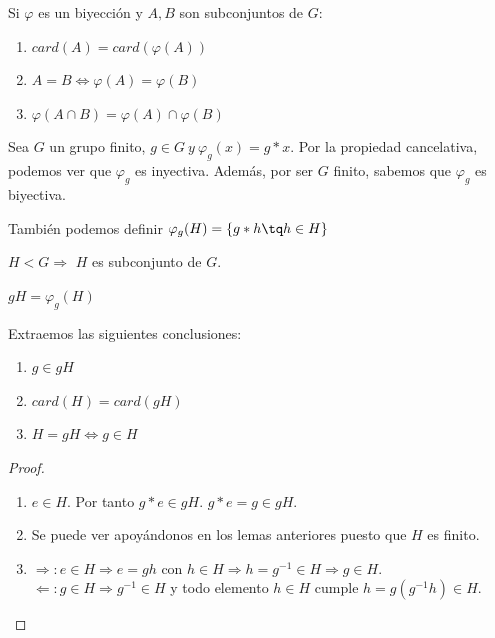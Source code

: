 \documentclass[a4paper,10pt]{apuntes}
\newenvironment{notacion}[1][Notación:]{\begin{trivlist}
\item[\hskip \labelsep {\bfseries #1}]}{\end{trivlist}}
\begin{document}
  \begin{lemma}
   Si $\varphi$  es un biyección y $A, B$ son subconjuntos de $G$:
   \begin{enumerate}
    \item $card(A)=card(\varphi(A))$
    \item $A=B \Leftrightarrow \varphi(A)=\varphi(B)$
    \item $\varphi(A\cap B)=\varphi(A)\cap\varphi(B)$
   \end{enumerate}
  \end{lemma}
  
  \begin{lemma}
   Sea $G$ un grupo finito, $g \in G\ y\ \varphi_{g}(x)=g*x$. Por la propiedad cancelativa, podemos ver que $\varphi_{g}$ es inyectiva.
   Además, por ser $G$ finito, sabemos que $\varphi_{g}$  es biyectiva.
  \end{lemma}
  También podemos definir $\varphi_{g}(H)=\{g*h\tq h\in H\}$
  \begin{lemma}
   $H<G\Rightarrow$  $H$ es subconjunto de $G$.
  \end{lemma}
  
  \begin{notacion}
   $gH=\varphi_{g}(H)$
  \end{notacion}

  \begin{corol} 
  Extraemos las siguientes conclusiones:
   \begin{enumerate}
    \item $g\in gH$
    \item $card(H)=card(gH)$
    \item $H=gH \Leftrightarrow  g \in H$
   \end{enumerate}
  \end{corol}

  \begin{proof}
   \begin{enumerate}
    \item $e \in  H$. Por tanto $g*e\in gH$. $g*e=g\in gH$.
    \item Se puede ver apoyándonos en los lemas anteriores puesto que $H$ es finito.
    \item $\Rightarrow: e \in H \Rightarrow e=gh$ con $h \in H \Rightarrow h=g^{-1}\in H \Rightarrow g \in H$.\\
	  $\Leftarrow: g \in H \Rightarrow g^{-1}\in H$ y todo elemento $h \in H$ cumple $h = g(g^{-1}h)\in H$.
   \end{enumerate}
  \end{proof}
  
\end{document}
